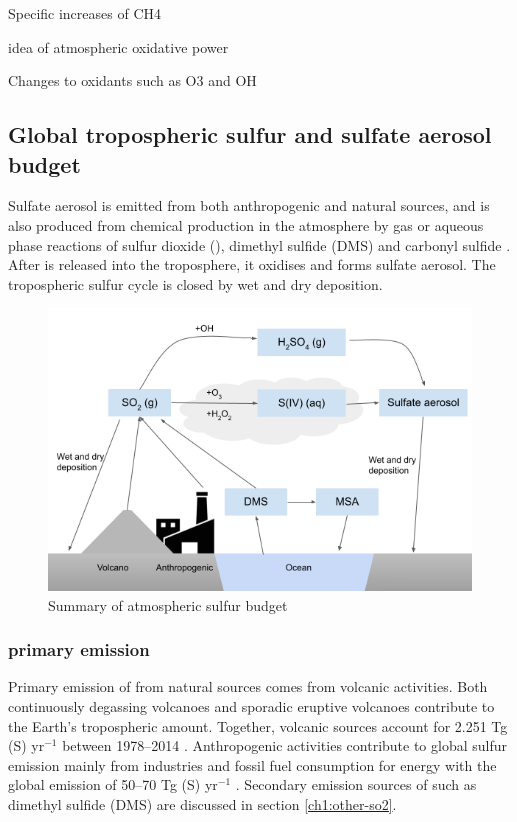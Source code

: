Specific increases of CH4 

idea of atmospheric oxidative power

Changes to oxidants such as O3 and OH

\subsection{Global tropospheric sulfur and sulfate aerosol budget}

Sulfate aerosol is emitted from both anthropogenic and natural sources, and is also produced from chemical production in the atmosphere by gas or aqueous phase reactions of sulfur dioxide (), dimethyl sulfide (DMS) and carbonyl sulfide \citep[OCS;][]{belvisoAssessmentMarineBiota2000}. After  is released into the troposphere, it oxidises and forms sulfate aerosol.  The tropospheric sulfur cycle is closed by wet and dry deposition.

\begin{figure}
    \centering
    \includegraphics[width=6in]{Chapter1/figs/sulfur_budget.png}
    \caption[Summary of atmospheric sulfur budget]{Summary of atmospheric sulfur budget}
    \label{fig:sulfur-budget}
\end{figure}

\subsubsection{ primary emission}

Primary emission of  from natural sources comes from volcanic activities. Both continuously degassing volcanoes and sporadic eruptive volcanoes contribute to the Earth's tropospheric  amount. Together, volcanic sources account for 2.251  Tg (S) yr$^{-1}$ between 1978--2014 \citep{carnMultidecadalSatelliteMeasurements2016}. Anthropogenic activities contribute to global sulfur emission mainly from industries and fossil fuel consumption for energy with the global emission of 50--70 Tg (S) yr$^{-1}$ \citep{forsterEarthEnergyBudget2021}. Secondary emission sources of   such as dimethyl sulfide (DMS) are discussed in section \ref{ch1:other-so2}.

